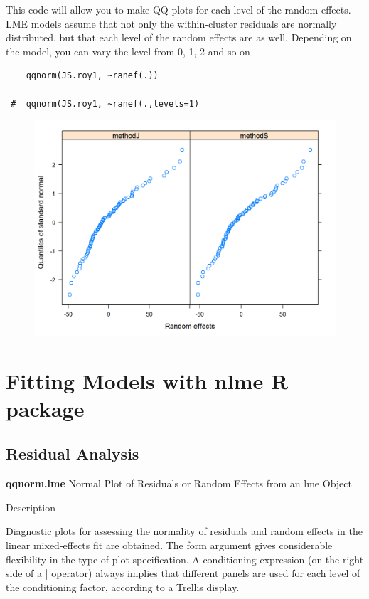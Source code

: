 \documentclass[Main.tex]{subfiles}
\begin{document}
This code will allow you to make QQ plots for each level of the random effects.  LME models assume that not only the within-cluster residuals are normally distributed, but that each level of the random effects are as well. Depending on the model, you can vary the level from 0, 1, 2 and so on
\begin{framed}
	\begin{verbatim}
	qqnorm(JS.roy1, ~ranef(.))

 # 	qqnorm(JS.roy1, ~ranef(.,levels=1)
	\end{verbatim}
\end{framed}
\begin{figure}[h!]
	\centering
	\includegraphics[width=0.9\linewidth]{images/ResidPlot2}
	\caption{}
	\label{fig:ResidPlot2}
\end{figure}

\section{Fitting Models with nlme R package}

\subsection{Residual Analysis}


\textbf{qqnorm.lme}
Normal Plot of Residuals or Random Effects from an lme Object

Description

Diagnostic plots for assessing the normality of residuals and random effects in the linear mixed-effects fit are obtained. 
The form argument gives considerable flexibility in the type of plot specification. 
A conditioning expression (on the right side of a | operator) always implies that different panels are used 
for each level of the conditioning factor, according to a Trellis display.
\end{document}
